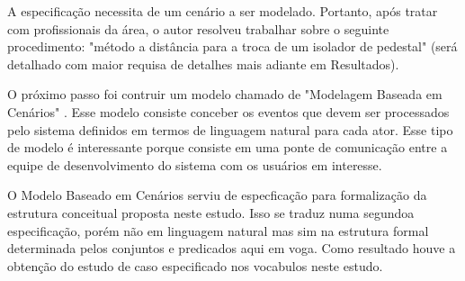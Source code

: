 A especificação necessita de um cenário a ser modelado. Portanto, após tratar com profissionais da área, o autor resolveu trabalhar sobre o seguinte procedimento: "método a distância para a troca de um isolador de pedestal" (será detalhado com maior requisa de detalhes mais adiante em Resultados).

O próximo passo foi contruir um modelo chamado de "Modelagem Baseada em Cenários" \cite{softwareeng}. Esse modelo consiste conceber os eventos que devem ser processados pelo sistema definidos em termos de linguagem natural para cada ator. Esse tipo de modelo é interessante porque consiste em uma ponte de comunicação entre a equipe de desenvolvimento do sistema com os usuários em interesse.     

O Modelo Baseado em Cenários serviu de especficação para formalização da estrutura conceitual proposta neste estudo. Isso se traduz numa segundoa especificação, porém não em linguagem natural mas sim na estrutura formal determinada pelos conjuntos e predicados aqui em voga. Como resultado houve a obtenção do estudo de caso especificado nos vocabulos neste estudo.